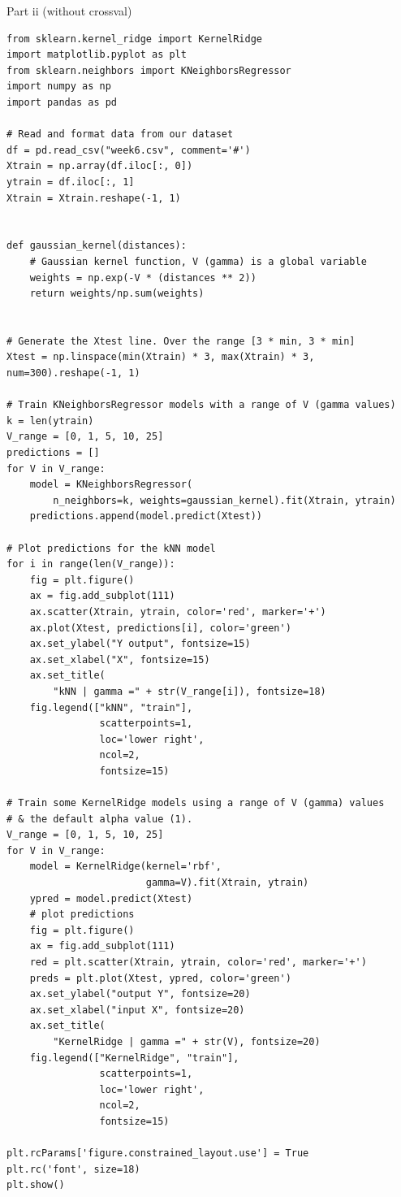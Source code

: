 \documentclass[10pt]{article}
\begin{document}
Part ii (without crossval)
\begin{lstlisting}
from sklearn.kernel_ridge import KernelRidge
import matplotlib.pyplot as plt
from sklearn.neighbors import KNeighborsRegressor
import numpy as np
import pandas as pd

# Read and format data from our dataset
df = pd.read_csv("week6.csv", comment='#')
Xtrain = np.array(df.iloc[:, 0])
ytrain = df.iloc[:, 1]
Xtrain = Xtrain.reshape(-1, 1)


def gaussian_kernel(distances):
    # Gaussian kernel function, V (gamma) is a global variable
    weights = np.exp(-V * (distances ** 2))
    return weights/np.sum(weights)


# Generate the Xtest line. Over the range [3 * min, 3 * min]
Xtest = np.linspace(min(Xtrain) * 3, max(Xtrain) * 3, num=300).reshape(-1, 1)

# Train KNeighborsRegressor models with a range of V (gamma values)
k = len(ytrain)
V_range = [0, 1, 5, 10, 25]
predictions = []
for V in V_range:
    model = KNeighborsRegressor(
        n_neighbors=k, weights=gaussian_kernel).fit(Xtrain, ytrain)
    predictions.append(model.predict(Xtest))

# Plot predictions for the kNN model
for i in range(len(V_range)):
    fig = plt.figure()
    ax = fig.add_subplot(111)
    ax.scatter(Xtrain, ytrain, color='red', marker='+')
    ax.plot(Xtest, predictions[i], color='green')
    ax.set_ylabel("Y output", fontsize=15)
    ax.set_xlabel("X", fontsize=15)
    ax.set_title(
        "kNN | gamma =" + str(V_range[i]), fontsize=18)
    fig.legend(["kNN", "train"],
                scatterpoints=1,
                loc='lower right',
                ncol=2,
                fontsize=15)

# Train some KernelRidge models using a range of V (gamma) values
# & the default alpha value (1).
V_range = [0, 1, 5, 10, 25]
for V in V_range:
    model = KernelRidge(kernel='rbf',
                        gamma=V).fit(Xtrain, ytrain)
    ypred = model.predict(Xtest)
    # plot predictions
    fig = plt.figure()
    ax = fig.add_subplot(111)
    red = plt.scatter(Xtrain, ytrain, color='red', marker='+')
    preds = plt.plot(Xtest, ypred, color='green')
    ax.set_ylabel("output Y", fontsize=20)
    ax.set_xlabel("input X", fontsize=20)
    ax.set_title(
        "KernelRidge | gamma =" + str(V), fontsize=20)
    fig.legend(["KernelRidge", "train"],
                scatterpoints=1,
                loc='lower right',
                ncol=2,
                fontsize=15)

plt.rcParams['figure.constrained_layout.use'] = True
plt.rc('font', size=18)
plt.show()
\end{lstlisting}
\end{document}
